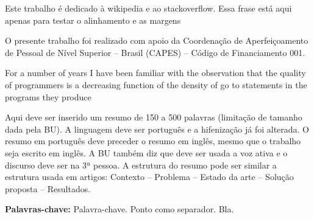 

\imprimircapa%
\imprimirfolhaderosto*
\protect{}
\imprimirfolhadecertificacao


\begin{dedicatoria}
  Este trabalho é dedicado à wikipedia e ao stackoverflow. Essa frase está aqui apenas para testar o alinhamento e as margens
\end{dedicatoria}


\begin{agradecimentos}
  O presente trabalho foi realizado com apoio da Coordenação de Aperfeiçoamento de Pessoal de Nível Superior -- Brasil (CAPES) -- Código de Financiamento 001.
\end{agradecimentos}


\begin{epigrafe}
  For a number of years I have been familiar with the observation that the quality of programmers is a decreasing function of the density of go to statements in the programs they produce \\
  \cite{dijkstra1968}
\end{epigrafe}


\begin{resumo}[Resumo]
  Aqui deve ser inserido um resumo de 150 a 500 palavras (limitação de tamanho dada pela BU). A linguagem deve ser português e a hifenização já foi alterada. O resumo em português deve preceder o resumo em inglês, mesmo que o trabalho seja escrito em inglês. A BU também diz que deve ser usada a voz ativa e o discurso deve ser na 3ª pessoa. A estrutura do resumo pode ser similar a estrutura usada em artigos: Contexto -- Problema -- Estado da arte -- Solução proposta  -- Resultados.

  \vspace{\baselineskip} 
  \textbf{Palavras-chave:} Palavra-chave. Ponto como separador. Bla.
\end{resumo}


